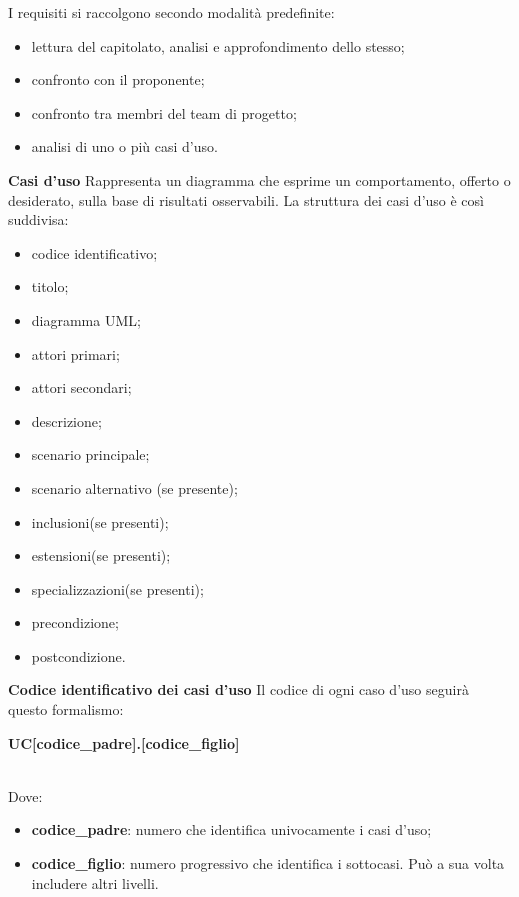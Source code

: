 			I requisiti si raccolgono secondo modalità predefinite:
			\begin{itemize}
				\item lettura del capitolato\glo, analisi e approfondimento dello stesso;
				\item confronto con il proponente;
				\item confronto tra membri del team di progetto;
				\item analisi di uno o più casi d'uso.  \\
			\end{itemize}
			\noindent
			\textbf{Casi d'uso} \newline \newline
			Rappresenta un diagramma che esprime un comportamento,
			offerto o desiderato, sulla base di risultati osservabili.
			La struttura dei casi d'uso è così suddivisa:
			\begin{itemize}
				\item codice identificativo;
				\item titolo;
				\item diagramma UML\glo;
				\item attori primari;
				\item attori secondari;
				\item descrizione;
				\item scenario principale;
				\item scenario alternativo (se presente);
				\item inclusioni(se presenti);
				\item estensioni(se presenti);
				\item specializzazioni(se presenti);
				\item precondizione;
				\item postcondizione. \\
			\end{itemize}
			\noindent
			\textbf{Codice identificativo dei casi d'uso} \newline \newline
			Il codice di ogni caso d'uso seguirà questo formalismo: \newline \newline
			\centerline{\textbf{UC[codice\_padre].[codice\_figlio]}} \\
			Dove:
			\begin{itemize}
				\item \textbf{codice\_padre}: numero che identifica univocamente i casi d'uso;
				\item \textbf{codice\_figlio}: numero progressivo che identifica i sottocasi. Può a sua volta includere altri livelli. \\
			\end{itemize}
